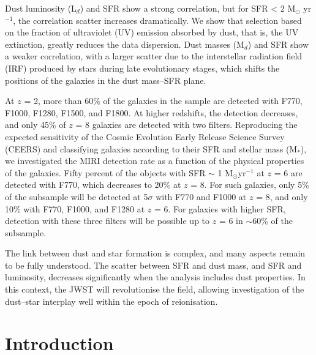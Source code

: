 \documentclass{aa}
\begin{document}
  {Dust luminosity (L$_d$) and SFR show a strong correlation, but for SFR < 2 M$_\odot$ yr$^{-1}$, the correlation scatter increases dramatically. We show that selection based on the fraction of ultraviolet (UV) emission absorbed by dust, that is, the UV extinction, greatly reduces the data dispersion. Dust masses (M$_d$) and SFR show a weaker correlation, with a larger scatter due to the interstellar radiation field (IRF) produced by stars during late evolutionary stages, which shifts the  positions of the galaxies in the dust mass--SFR plane.
  
  At $z$ = 2, more than 60\% of the galaxies in the sample are detected with F770, F1000, F1280, F1500, and F1800. At higher redshifts, the detection decreases, and only 45\% of $z$ = 8 galaxies are detected with two filters. Reproducing the expected sensitivity of the Cosmic Evolution Early Release Science Survey (CEERS) and classifying galaxies according to their SFR and stellar mass (M$_\ast$), we investigated the MIRI detection rate as a function of the physical properties of the  galaxies. Fifty percent of the objects with SFR $\sim$ 1 M$_\odot$yr$^{-1}$ at $z$ = 6 are detected with F770, which decreases to 20\% at $z$ = 8. For such galaxies, only 5\% of the subsample will be detected at 5$\sigma$ with F770 and F1000 at $z$ = 8, and only 10\% with F770, F1000, and F1280 at $z$ = 6. For galaxies with higher SFR, detection with these three filters will be possible up to $z$ = 6 in $\sim$60\% of the subsample.} 
  {The link between dust and star formation is complex, and many aspects remain to be fully understood. The scatter between SFR and dust mass, and SFR and luminosity, decreases significantly when the analysis includes dust properties. In this context, the JWST will revolutionise the field, allowing investigation of the dust--star interplay well within the epoch of reionisation.}
  \maketitle

\section{Introduction}
\end{document}
